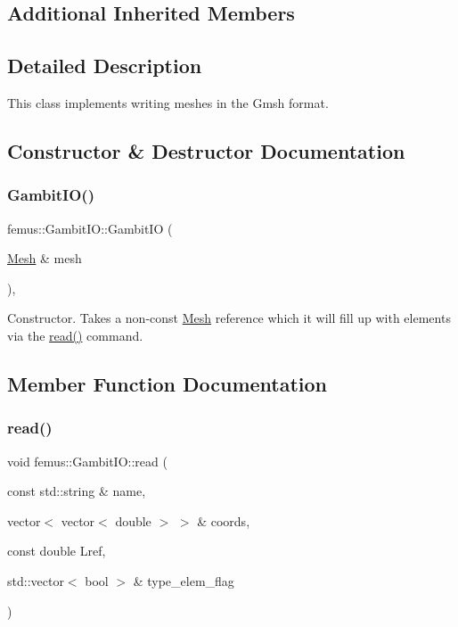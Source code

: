 \subsection*{Additional Inherited Members}


\subsection{Detailed Description}
This class implements writing meshes in the Gmsh format. 

\subsection{Constructor \& Destructor Documentation}
\mbox{\label{classfemus_1_1_gambit_i_o_adc85d54e3d9628db1fed594103f43c7a}} 
\subsubsection{\texorpdfstring{Gambit\+I\+O()}{GambitIO()}}
{\footnotesize\ttfamily femus\+::\+Gambit\+I\+O\+::\+Gambit\+IO (\begin{DoxyParamCaption}\item[{\mbox{\hyperlink{classfemus_1_1_mesh}{Mesh}} \&}]{mesh }\end{DoxyParamCaption})\hspace{0.3cm}{\ttfamily [inline]}, {\ttfamily [explicit]}}

Constructor. Takes a non-\/const \mbox{\hyperlink{classfemus_1_1_mesh}{Mesh}} reference which it will fill up with elements via the \mbox{\hyperlink{classfemus_1_1_gambit_i_o_a5457692b7562f09d2d14e9b16cfd4488}{read()}} command. 

\subsection{Member Function Documentation}
\mbox{\label{classfemus_1_1_gambit_i_o_a5457692b7562f09d2d14e9b16cfd4488}} 
\subsubsection{\texorpdfstring{read()}{read()}}
{\footnotesize\ttfamily void femus\+::\+Gambit\+I\+O\+::read (\begin{DoxyParamCaption}\item[{const std\+::string \&}]{name,  }\item[{vector$<$ vector$<$ double $>$ $>$ \&}]{coords,  }\item[{const double}]{Lref,  }\item[{std\+::vector$<$ bool $>$ \&}]{type\+\_\+elem\+\_\+flag }\end{DoxyParamCaption})\hspace{0.3cm}{\ttfamily [virtual]}}

